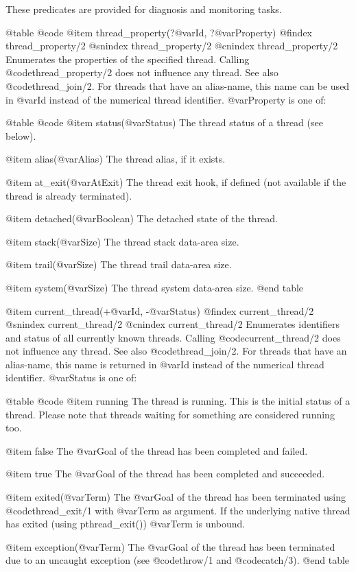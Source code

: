 {{{{{{{{{These predicates are provided for diagnosis and monitoring tasks.


@table @code
@item thread_property(?@var{Id}, ?@var{Property})
@findex thread_property/2
@snindex thread_property/2
@cnindex thread_property/2
Enumerates the properties of the specified thread.
Calling @code{thread_property/2} does not influence any thread.  See also
@code{thread_join/2}.  For threads that have an alias-name, this name can
be used in @var{Id} instead of the numerical thread identifier.
@var{Property} is one of:

@table @code
    @item status(@var{Status})
The thread status of a thread (see below).

    @item alias(@var{Alias})
The thread alias, if it exists.

    @item at_exit(@var{AtExit})
The thread exit hook, if defined (not available if the thread is already terminated).

    @item detached(@var{Boolean})
The detached state of the thread.

    @item stack(@var{Size})
The thread stack data-area size.

    @item trail(@var{Size})
The thread trail data-area size.

    @item system(@var{Size})
The thread system data-area size.
@end table

@item current_thread(+@var{Id}, -@var{Status})
@findex current_thread/2
@snindex current_thread/2
@cnindex current_thread/2
Enumerates identifiers and status of all currently known threads.
Calling @code{current_thread/2} does not influence any thread.  See also
@code{thread_join/2}.  For threads that have an alias-name, this name is
returned in @var{Id} instead of the numerical thread identifier.
@var{Status} is one of:

@table @code
    @item running
The thread is running.  This is the initial status of a thread.  Please
note that threads waiting for something are considered running too.

    @item false
The @var{Goal} of the thread has been completed and failed.

    @item true
The @var{Goal} of the thread has been completed and succeeded.

    @item exited(@var{Term})
The @var{Goal} of the thread has been terminated using @code{thread_exit/1}
with @var{Term} as argument.  If the underlying native thread has
exited (using pthread_exit()) @var{Term} is unbound.

    @item exception(@var{Term})
The @var{Goal} of the thread has been terminated due to an uncaught
exception (see @code{throw/1} and @code{catch/3}).
@end table

}}}}}}}}}
